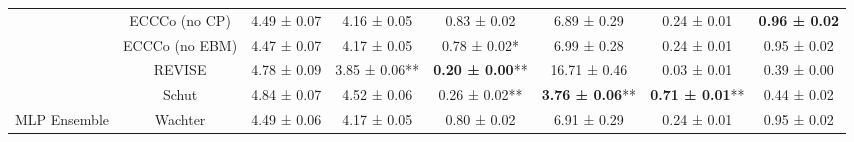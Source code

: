 \begin{table}
{\begin{tabular}[t]{cccccccc}
 & ECCCo (no CP) & 4.49 ± 0.07\hphantom{*}\hphantom{*} & 4.16 ± 0.05\hphantom{*}\hphantom{*} & 0.83 ± 0.02\hphantom{*}\hphantom{*} & 6.89 ± 0.29\hphantom{*}\hphantom{*} & 0.24 ± 0.01\hphantom{*}\hphantom{*} & \textbf{0.96 ± 0.02}\hphantom{*}\hphantom{*}\\

 & ECCCo (no EBM) & 4.47 ± 0.07\hphantom{*}\hphantom{*} & 4.17 ± 0.05\hphantom{*}\hphantom{*} & 0.78 ± 0.02*\hphantom{*} & 6.99 ± 0.28\hphantom{*}\hphantom{*} & 0.24 ± 0.01\hphantom{*}\hphantom{*} & 0.95 ± 0.02\hphantom{*}\hphantom{*}\\

 & REVISE & 4.78 ± 0.09\hphantom{*}\hphantom{*} & 3.85 ± 0.06** & \textbf{0.20 ± 0.00}** & 16.71 ± 0.46\hphantom{*}\hphantom{*} & 0.03 ± 0.01\hphantom{*}\hphantom{*} & 0.39 ± 0.00\hphantom{*}\hphantom{*}\\

 & Schut & 4.84 ± 0.07\hphantom{*}\hphantom{*} & 4.52 ± 0.06\hphantom{*}\hphantom{*} & 0.26 ± 0.02** & \textbf{3.76 ± 0.06}** & \textbf{0.71 ± 0.01}** & 0.44 ± 0.02\hphantom{*}\hphantom{*}\\

\multirow[t]{-10}{*}{\centering\arraybackslash MLP Ensemble} & Wachter & 4.49 ± 0.06\hphantom{*}\hphantom{*} & 4.17 ± 0.05\hphantom{*}\hphantom{*} & 0.80 ± 0.02\hphantom{*}\hphantom{*} & 6.91 ± 0.29\hphantom{*}\hphantom{*} & 0.24 ± 0.01\hphantom{*}\hphantom{*} & 0.95 ± 0.02\hphantom{*}\hphantom{*}\\
\bottomrule
\end{tabular}}
\end{table}
